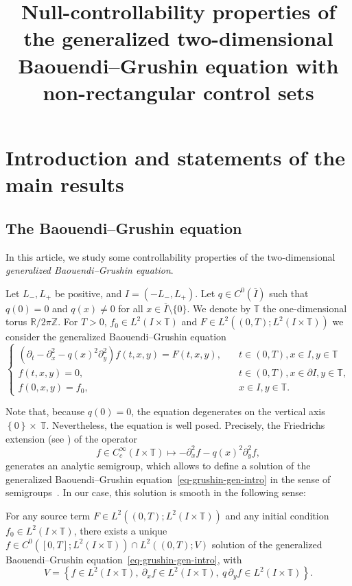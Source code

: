 \documentclass[AHL,Unicode,longabstracts,published]{cedram}
\title[Null-controllability of the Baouendi--Grushin equation]{Null-controllability properties of the generalized two-dimensional Baouendi--Grushin equation with non-rectangular control sets}
\author[\initial{J.} \lastname{Dardé}]{\firstname{Jérémi} \lastname{Dardé}}
\author[\initial{A.} \lastname{Koenig}]{\firstname{Armand} \lastname{Koenig}}
\author[\initial{J.} \lastname{Royer}]{\firstname{Julien} \lastname{Royer}}
\newcommand{\1}{\mathds 1}
\newcommand{\R}{\mathbb{R}}
\newcommand{\Z}{\mathbb{Z}}
\newcommand{\T}{\mathbb{T}}
\begin{document}
\maketitle

\section{Introduction and statements of the main results}

\subsection{The Baouendi--Grushin equation}

In this article, we study some controllability properties of the two-dimensional \emph{generalized Baouendi--Grushin equation}.

Let $L_-,L_+$ be positive, and $I = (-L_-,L_+)$. Let $q \in C^0(\overline I)$ such that $q(0)= 0$ and $q(x) \neq 0$ for all $x \in \overline I\setminus \{0\}$. We denote by $\T$ the one-dimensional torus $\R/2\pi \Z$. For $T > 0$, $f_0 \in L^2(I\times \T)$ and $F \in L^2((0,T);L^2(I \times \T))$ we consider the generalized Baouendi--Grushin equation
\begin{equation}\label{eq-grushin-gen-intro}
\left\{
\begin{array}{ll}
\left(\partial_t-\partial_x^2 - q(x)^2 \partial_y^2\right)f(t,x,y) = F(t,x,y),&\quad t\in (0,T), x\in I, y\in \T\\
f(t,x,y) = 0,&\quad t\in (0,T), x \in \partial I, y\in \T, \\
f(0,x,y) = f_0, & \quad x\in I, y\in \T.
\end{array}\right.
\end{equation}

Note that, because $q(0) = 0$, the equation degenerates on the vertical axis $\left\lbrace 0 \right\rbrace \times~\T$. Nevertheless, the equation is well posed. Precisely, the Friedrichs extension (see \cite[Section~4.3]{Helffer13}) of the operator
\[
f \in C^\infty_c(I\times \T) \mapsto - \partial^2_x f - q(x)^2 \partial_y^2 f,
\]
generates an analytic semigroup, which allows to define a solution of the generalized Baouendi--Grushin equation~\eqref{eq-grushin-gen-intro} in the sense of semigroups~\cite{Brezis11}. In our case, this solution is smooth in the following sense:

\begin{prop}\label{prop_wellposedness}
For any source term $F \in L^2((0,T);{L^2(I\times \T)})$ and any initial condition $f_0 \in L^2(I\times \T)$, there exists a unique $f \in C^0([0,T];L^2(I\times \T)) \cap L^2((0,T);V)$ solution of the generalized Baouendi--Grushin equation~\eqref{eq-grushin-gen-intro}, with
\[
V = \left\lbrace f \in L^2(I\times \T), \ \partial_x f \in L^2(I\times \T),\ q\, \partial_y f \in L^2(I\times \T) \right\rbrace.
\]
\end{prop}
\end{document}
